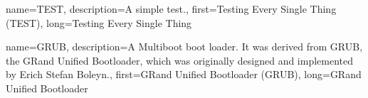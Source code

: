 {
    name={TEST},
    description={A simple test.},
    first={Testing Every Single Thing (TEST)},
    long={Testing Every Single Thing}
}

{
    name={GRUB},
    description={A Multiboot boot loader. It was derived from GRUB, the GRand Unified Bootloader, which was                 originally designed and implemented by Erich Stefan Boleyn.},
    first={GRand Unified Bootloader (GRUB)},
    long={GRand Unified Bootloader}
}